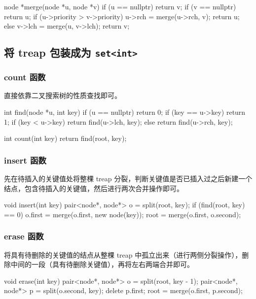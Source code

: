 \begin{cppcode}
node *merge(node *u, node *v) {
  if (u == nullptr) {
    return v;
  }
  if (v == nullptr) {
    return u;
  }
  if (u->priority > v->priority) {
    u->rch = merge(u->rch, v);
    return u;
  } else {
    v->lch = merge(u, v->lch);
    return v;
  }
}
\end{cppcode}

\subsection{将 treap 包装成为 \texttt{set<int>}}

\subsubsection{count 函数}

直接依靠二叉搜索树的性质查找即可。

\begin{cppcode}
int find(node *u, int key) {
  if (u == nullptr) {
    return 0;
  }
  if (key == u->key) {
    return 1;
  }
  if (key < u->key) {
    return find(u->lch, key);
  } else {
    return find(u->rch, key);
  }
}

int count(int key) { return find(root, key); }
\end{cppcode}

\subsubsection{insert 函数}

先在待插入的关键值处将整棵 treap 分裂，判断关键值是否已插入过之后新建一个结点，包含待插入的关键值，然后进行两次合并操作即可。

\begin{cppcode}
void insert(int key) {
  pair<node*, node*> o = split(root, key);
  if (find(root, key) == 0) {
    o.first = merge(o.first, new node(key));
  }
  root = merge(o.first, o.second);
}
\end{cppcode}

\subsubsection{erase 函数}

将具有待删除的关键值的结点从整棵 treap 中孤立出来（进行两侧分裂操作），删除中间的一段（具有待删除关键值），再将左右两端合并即可。

\begin{cppcode}
void erase(int key) {
  pair<node*, node*> o = split(root, key - 1);
  pair<node*, node*> p = split(o.second, key);
  delete p.first;
  root = merge(o.first, p.second);
}
\end{cppcode}

